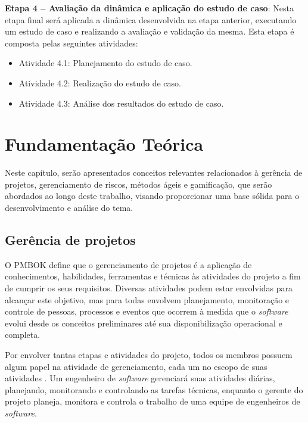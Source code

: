 \documentclass[
	12pt,
	openright,
	twoside,
	a4paper,
	english,
	brazil
	]{abntex2}
\begin{document}
\textbf{Etapa 4 -- Avaliação da dinâmica e aplicação do estudo de caso}: Nesta etapa final será aplicada a dinâmica desenvolvida na etapa anterior, executando um estudo de caso e realizando a avaliação e validação da mesma. Esta etapa é composta pelas seguintes atividades:


\begin{itemize}
  \item[] Atividade 4.1: Planejamento do estudo de caso.
  \item[] Atividade 4.2: Realização do estudo de caso.
  \item[] Atividade 4.3: Análise dos resultados do estudo de caso.
\end{itemize}


\chapter{Fundamentação Teórica}
\label{cap:fundamentacao-teorica}


Neste capítulo, serão apresentados conceitos relevantes relacionados à gerência de projetos, gerenciamento de riscos, métodos ágeis e gamificação, que serão abordados ao longo deste trabalho, visando proporcionar uma base sólida para o desenvolvimento e análise do tema.

\section{Gerência de projetos}

O PMBOK \cite{PMBOK} define que o gerenciamento de projetos é a aplicação de conhecimentos, habilidades, ferramentas e técnicas às atividades do projeto a fim de cumprir os seus requisitos. Diversas atividades podem estar envolvidas para alcançar este objetivo, mas para  todas envolvem planejamento, monitoração e controle de pessoas, processos e eventos que ocorrem à medida que o \textit{software} evolui desde os conceitos preliminares até sua disponibilização operacional e completa.

Por envolver tantas etapas e atividades do projeto, todos os membros possuem algum papel na atividade de gerenciamento, cada um no escopo de suas atividades \cite{Pressman_2014}. Um engenheiro de \textit{software} gerenciará suas atividades diárias, planejando, monitorando e controlando as tarefas técnicas, enquanto o gerente do projeto planeja, monitora e controla o trabalho de uma equipe de engenheiros de \textit{software}.
\end{document}
